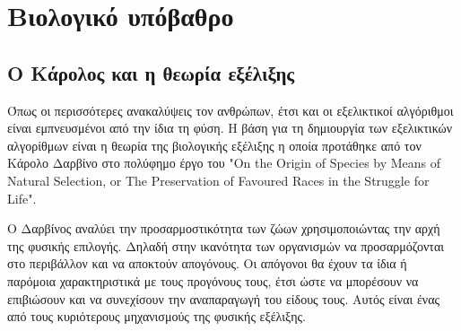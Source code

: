 \section{Βιολογικό υπόβαθρο}

\subsection{Ο Κάρολος και η θεωρία εξέλιξης}
Όπως οι περισσότερες ανακαλύψεις τον ανθρώπων, έτσι και οι εξελικτικοί αλγόριθμοι είναι εμπνευσμένοι από την ίδια τη φύση. Η βάση για τη δημιουργία των εξελικτικών αλγορίθμων είναι η θεωρία της βιολογικής εξέλιξης η οποία προτάθηκε από τον Κάρολο Δαρβίνο στο πολύφημο έργο του "On the Origin of Species by Means of Natural Selection, or The Preservation of Favoured Races in the Struggle for Life".

Ο Δαρβίνος αναλύει την προσαρμοστικότητα των ζώων χρησιμοποιώντας την αρχή της φυσικής επιλογής. Δηλαδή στην ικανότητα των οργανισμών να προσαρμόζονται στο περιβάλλον και να αποκτούν απογόνους. Οι απόγονοι θα έχουν τα ίδια ή παρόμοια χαρακτηριστικά με τους προγόνους τους, έτσι ώστε να μπορέσουν να επιβιώσουν και να συνεχίσουν την αναπαραγωγή του είδους τους. Αυτός είναι ένας από τους κυριότερους μηχανισμούς της φυσικής εξέλιξης.

